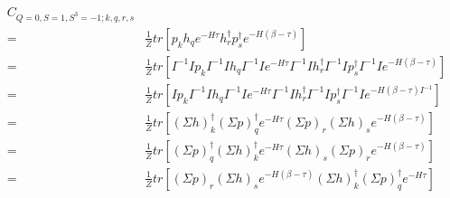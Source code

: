 \begin{equation}
  \begin{aligned}
    C_{Q=0,S=1,S^3=-1;k,q,r,s} \\
    =& \frac{1}{Z}tr\left[p_kh_qe^{-H\tau}h^\dagger_rp^\dagger_se^{-H\left(\beta-\tau\right)}\right] \\
    =& \frac{1}{Z}tr\left[I^{-1}Ip_kI^{-1}Ih_qI^{-1}Ie^{-H\tau}I^{-1}Ih^\dagger_rI^{-1}Ip^\dagger_sI^{-1}Ie^{-H\left(\beta-\tau\right)}\right] \\
    =& \frac{1}{Z}tr\left[Ip_kI^{-1}Ih_qI^{-1}Ie^{-H\tau}I^{-1}Ih^\dagger_rI^{-1}Ip^\dagger_sI^{-1}Ie^{-H\left(\beta-\tau\right)I^{-1}}\right] \\
    =& \frac{1}{Z}tr\left[(\Sigma h)^\dagger_k(\Sigma p)^\dagger_qe^{-H\tau}(\Sigma p)_r(\Sigma h)_se^{-H\left(\beta-\tau\right)}\right] \\
    =& \frac{1}{Z}tr\left[(\Sigma p)^\dagger_q(\Sigma h)^\dagger_ke^{-H\tau}(\Sigma h)_s(\Sigma p)_re^{-H\left(\beta-\tau\right)}\right] \\
    =& \frac{1}{Z}tr\left[(\Sigma p)_r(\Sigma h)_se^{-H\left(\beta-\tau\right)}(\Sigma h)^\dagger_k(\Sigma p)^\dagger_qe^{-H\tau}\right]
  \end{aligned}
\end{equation}

\renewcommand{\cor}[4]{p_{#1}h_{#2}h^\dagger_{#3}p^\dagger_{#4}}
\newcommand{\dscor}[4]{\left(\Sigma h\right)_{#1}^\dagger \left(\Sigma p\right)_{#2}^\dagger \left(\Sigma p\right)_{#3}\left(\Sigma h\right)_{#4}}
\renewcommand{\dcor}[4]{h_{#1}^\dagger p_{#2}^\dagger p_{#3} h_{#4}}

